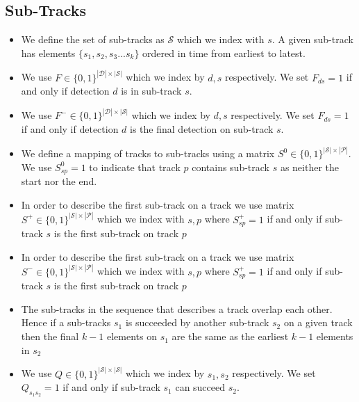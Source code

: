 \documentclass{article}
\begin{document}
\subsection{Sub-Tracks }
   \begin{itemize}
\item 
We define the set of sub-tracks as $\mathcal{S}$ which we index with $s$.  A given sub-track has elements $\{s_1,s_2,s_3...s_k\}$ ordered in time from earliest to latest.  
\item
We use $F \in \{ 0,1\}^{|\mathcal{D}| \times |\mathcal{S}|}$ which we index by $d,s$ respectively.   We set $F_{ds}=1$ if and only if detection $d$ is in sub-track $s $.  
\item
We use $F^- \in \{ 0,1\}^{|\mathcal{D}| \times |\mathcal{S}|}$ which we index by $d,s$ respectively.   We set $F_{ds}=1$ if and only if detection $d$ is the final detection on sub-track $s$.  
\item 
We define a mapping of tracks to sub-tracks using a matrix $S^0 \in \{0,1 \}^{|\mathcal{S}|\times |\mathcal{P}|}$.  We use $S^0_{sp}=1$ to indicate that track $p$ contains sub-track $s$ as neither the start nor the end.  
\item 
In order to describe the first sub-track on a  track we use matrix $S^+ \in \{0,1 \}^{|\mathcal{S}|\times |\mathcal{P}|}$ which we index with $s,p$ where $S^+_{sp}=1$ if and only if sub-track $s$ is the first sub-track on track $p$
\item 
In order to describe the first sub-track on a  track we use matrix $S^- \in \{0,1 \}^{|\mathcal{S}|\times |\mathcal{P}|}$ which we index with  $s,p$ where $S^+_{sp}=1$ if and only if sub-track $s$ is the first sub-track on track $p$

\item 
The sub-tracks in the sequence that describes a track overlap each other.  Hence if a sub-tracks $s_1$ is succeeded by another sub-track $s_2$ on a given track then the final $k-1$ elements on $s_1$ are the same as the earliest $k-1$ elements in $s_2$
\item
We use $Q \in \{ 0,1\}^{|\mathcal{S}| \times |\mathcal{S}|}$ which we index by $s_1,s_2$ respectively.   We set $Q_{s_1s_2}=1$ if and only if sub-track $s_1$ can succeed $s_2$.  
\end{itemize}
\end{document}
